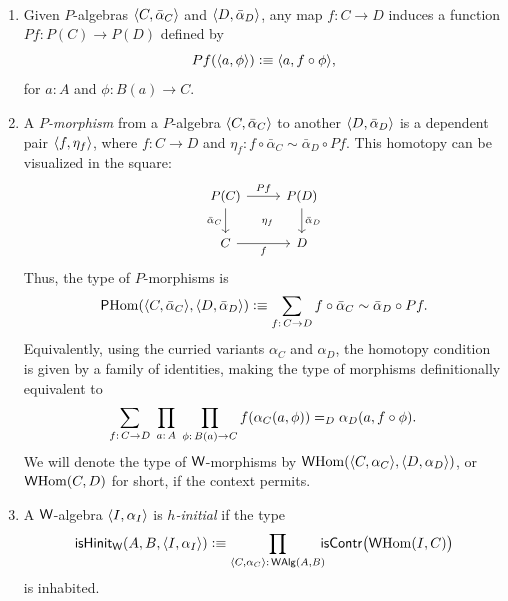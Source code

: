 \begin{defns}\ 
    \begin{enumerate}[-]
        \item Given $P$-algebras $\langle C,\bar\alpha_C\rangle$ and $\langle D,\bar\alpha_D\rangle$, any map $f\colon C\to D$ induces a function $Pf\colon P(C)\to P(D)$ defined by
        \[
            Pf(\langle a,\phi\rangle)\mathrel{\vcentcolon}\equiv\langle a,f\circ\phi\rangle,
        \]
        for $a\colon A$ and $\phi\colon B(a)\to C$.
        
        \item A \textsl{$P$-morphism} from a $P$-algebra $\langle C,\bar\alpha_C\rangle$ to another $\langle D,\bar\alpha_D\rangle$ is a dependent pair $\langle f,\eta_f\rangle$, where $f\colon C\to D$ and $\eta_f\colon f\circ\bar\alpha_C\sim\bar\alpha_D\circ Pf$. This homotopy can be visualized in the square:
        \[
            \begin{tikzcd}[font=\small]
                P(C)\arrow[r,"Pf"]
                        \arrow[d,"\bar\alpha_C"']
                        \arrow[dr,
                            phantom,
                            "\scriptstyle\eta_f"]
                    &P(D)
                        \arrow[d,"\bar\alpha_D"]\\
                C
                        \arrow[r,"f"']
                    &D
            \end{tikzcd}
        \]
        Thus, the type of $P$-morphisms is
        \[
            \fun P\Hom(\dep{C,\bar\alpha_C},\dep{D,\bar\alpha_D})
                \defeq\sum_{f\colon C\to D}
                    f\circ\bar\alpha_C\sim\bar\alpha_D\circ Pf.
        \]
        Equivalently, using the curried variants $\alpha_C$ and $\alpha_D$, the homotopy condition is given by a family of identities, making the type of morphisms definitionally equivalent to
        \begin{equation}\label{eq:structure-coherence}
            \sum_{f\colon C\to D}\;
                \prod_{a\colon A}\;
                \prod_{\phi\colon B(a)\to C}
                    f(\alpha_C(a,\phi))\eq D\alpha_D(a,f\circ\phi).
        \end{equation}
        We will denote the type of $\mathsf{W}$-morphisms by $\mathsf{W}{\operatorname{Hom}}(\langle C,\alpha_C\rangle,\langle D,\alpha_D\rangle)$, or $\mathsf{W}{\operatorname{Hom}}(C,D)$ for short, if the context permits.

        \item A $\mathsf{W}$-algebra $\langle I,\alpha_I\rangle$ is \textsl{$h$-initial} if the type
        \[
            \fun{isHinit}_{\fun W}(A,B,\dep{I,\alpha_I})
            \defeq
            \prod_{\dep{C,\alpha_C}\colon\fun W\fun{Alg}(A,B)}
            \!\!\!\fun{isContr}
            \bigl(
                \fun W\Hom(I,C)
            \bigr)
        \]
        is inhabited.
    \end{enumerate}
\end{defns}

